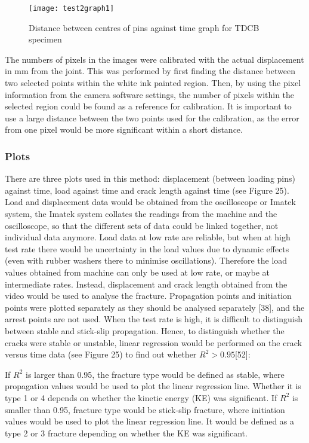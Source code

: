 \documentclass[numbers=noendperiod,chapterprefix=on]{icldt} %
\begin{document}
\begin{figure}[!htpb]
\centering
\texttt{[image: test2graph1]}
\caption{Distance between centres of pins against time graph for TDCB specimen } %
\end{figure}

The numbers of pixels in the images were calibrated with the actual displacement in mm from the joint. This was performed by first finding the distance between two selected points within the white ink painted region. Then, by using the pixel information from the camera software settings, the number of pixels within the selected region could be found as a reference for calibration. It is important to use a large distance between the two points used for the calibration, as the error from one pixel would be more significant within a short distance. 

\subsubsection{Plots}
There are three plots used in this method: displacement (between loading pins) against time, load against time and crack length against time (see Figure 25). 
Load and displacement data would be obtained from the oscilloscope or Imatek system, the Imatek system collates the readings from the machine and the oscilloscope, so that the different sets of data could be linked together, not individual data anymore. Load data at low rate are reliable, but when at high test rate there would be uncertainty in the load values due to dynamic effects (even with rubber washers there to minimise oscillations). Therefore the load values obtained from machine can only be used at low rate, or maybe at intermediate rates. Instead, displacement and crack length obtained from the video would be used to analyse the fracture. 
Propagation points and initiation points were plotted separately as they should be analysed separately [38], and the arrest points are not used. When the test rate is high, it is difficult to distinguish between stable and stick-slip propagation. Hence, to distinguish whether the cracks were stable or unstable, linear regression would be performed on the crack versus time data (see Figure 25) to find out whether $R^2 > 0.95$[52]:

If $R^2$ is larger than 0.95, the fracture type would be defined as stable, where propagation values would be used to plot the linear regression line. Whether it is type 1 or 4 depends on whether the kinetic energy (KE) was significant. 
If $R^2$ is smaller than 0.95, fracture type would be stick-slip fracture, where initiation values would be used to plot the linear regression line. It would be defined as a type 2 or 3 fracture depending on whether the KE was significant.
\end{document}
